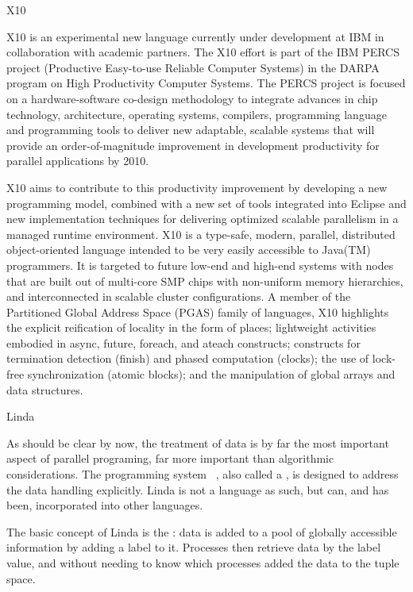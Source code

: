 
 {X10}

X10 is an experimental new language currently under development at
IBM in collaboration with academic partners. The X10 effort
is part of the IBM PERCS project (Productive Easy-to-use Reliable
Computer Systems) in the DARPA program on High Productivity Computer
Systems. The PERCS project is focused on a hardware-software co-design
methodology to integrate advances in chip technology, architecture,
operating systems, compilers, programming language and programming
tools to deliver new adaptable, scalable systems that will provide an
order-of-magnitude improvement in development productivity for
parallel applications by 2010.

X10 aims to contribute to this productivity improvement by developing
a new programming model, combined with a new set of tools integrated
into Eclipse and new implementation techniques for delivering
optimized scalable parallelism in a managed runtime environment. X10
is a type-safe, modern, parallel, distributed object-oriented language
intended to be very easily accessible to Java(TM) programmers. It is
targeted to future low-end and high-end systems with nodes that are
built out of multi-core SMP chips with non-uniform memory hierarchies,
and interconnected in scalable cluster configurations. A member of the
Partitioned Global Address Space (PGAS) family of languages, X10
highlights the explicit reification of locality in the form of places;
lightweight activities embodied in async, future, foreach, and ateach
constructs; constructs for termination detection (finish) and phased
computation (clocks); the use of lock-free synchronization (atomic
blocks); and the manipulation of global arrays and data structures.


 {Linda}

As should be clear by now, the treatment of data is by far the most
important aspect of parallel programing, far more important than
algorithmic considerations. The programming system
~\cite{Gelernter85generativecommunication,Linda-CACM}, also called a
, is designed to address the data
handling explicitly. Linda is not a language as such, but can, and has
been, incorporated into other languages.

The basic concept of Linda is the : data is added
to a pool of globally accessible information by adding a label to
it. Processes then retrieve data by the label value, and without needing to
know which processes added the data to the tuple space.

